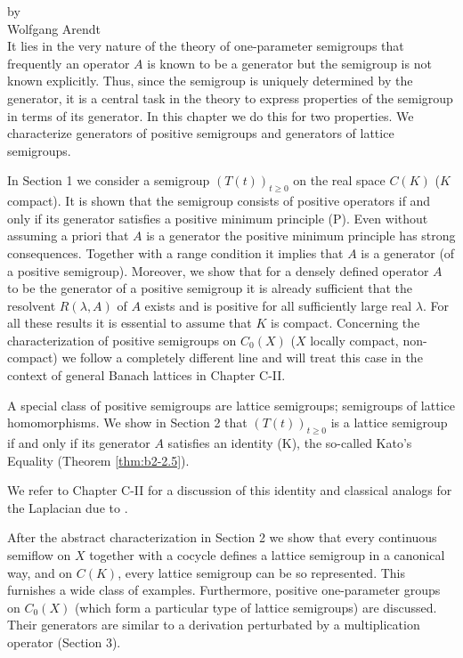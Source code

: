 \setcounter{chapter}{1}
\label{chap:b2}%
{\Large
\vspace*{-.75cm}
by \\[.25em]
Wolfgang Arendt 
\vspace{.75cm}
\\
}
It lies in the very nature of the theory of one-parameter semigroups that frequently an operator $A$ is known to be a generator but the semigroup is not known explicitly.
Thus, since the semigroup is uniquely determined by the generator, it is a central task in the theory to express properties of the semigroup in terms of its generator.
In this chapter we do this for two properties.
We characterize generators of positive semigroups and generators of lattice semigroups.

In Section 1 we consider a semigroup $(T(t))_{t \geq 0}$ on the real space $C(K)$ ($K$ compact).
It is shown that the semigroup consists of positive operators if and only if its generator satisfies a positive minimum principle (P).
Even without assuming a priori that $A$ is a generator the positive minimum principle has strong consequences.
Together with a range condition it implies that $A$ is a generator (of a positive semigroup).
Moreover, we show that for a densely defined operator $A$ to be the generator of a positive semigroup it is already sufficient that the resolvent $R(\lambda,A)$ of $A$ exists and is positive for all sufficiently large real $\lambda$.
For all these results it is essential to assume that $K$ is compact.
Concerning the characterization of positive semigroups on $C_{0}(X)$ ($X$ locally compact, non-compact) we follow a completely different line and will treat this case in the context of general Banach lattices in Chapter C-II.

A special class of positive semigroups are lattice semigroups; \ie  semigroups of lattice homomorphisms.
We show in Section 2 that $(T(t))_{t \geq 0}$ is a lattice semigroup if and only if its generator $A$ satisfies an identity (K), the so-called Kato's Equality (Theorem \ref{thm:b2-2.5}).

We refer to Chapter C-II for a discussion of this identity and classical analogs for the Laplacian due to \citet{kato:1973}.

After the abstract characterization in Section 2 we show that every continuous semiflow on $X$ together with a cocycle defines a lattice semigroup in a canonical way, and on $C(K)$, every lattice semigroup can be so represented.
This furnishes a wide class of examples.
Furthermore, positive one-parameter groups on $C_{0}(X)$ (which form a particular type of lattice semigroups) are discussed.
Their generators are similar to a derivation perturbated by a multiplication operator (Section 3).

